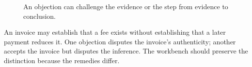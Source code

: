 \begin{figure}[H]
\centering
{}
\caption{An objection can challenge the evidence or the step from evidence to conclusion.}\label{fig:teach-M05-04}
\end{figure}

An invoice may establish that a fee exists without establishing that a later payment reduces it. One objection disputes the invoice's authenticity; another accepts the invoice but disputes the inference. The workbench should preserve the distinction because the remedies differ.

